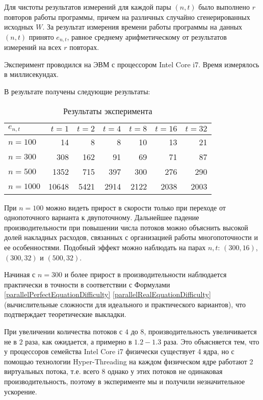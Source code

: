 \documentclass{article}
\begin{document}
	Для чистоты результатов измерений для каждой пары $(n,t)$ было выполнено $r$ повторов работы программы, причем на различных случайно сгенерированных исходных $W$. За результат измерения времени работы программы на данных $(n,t)$ принято $e_{n,t}$, равное среднему арифметическому от результатов измерений на всех $r$ повторах.
	
	Эксперимент проводился на ЭВМ с процессором Intel Core i7. Время измерялось в миллисекундах.
	
	В результате получены следующие результаты:
	
	\begin{table}
	\caption{Результаты эксперимента}
	\begin{center}
	\begin{tabular}{ | l | rrrrrr | }
		\hline
		$e_{n,t}$ & $t=1$   & $t=2$  & $t=4$  & $t=8$  & $t=16$ & $t=32$ \\ 
		\hline        
		$n=100$   & 14      & 8      & 8      & 10     & 13     & 21     \\
		$n=300$   & 308     & 162    & 91     & 69     & 71     & 87     \\
		$n=500$   & 1352    & 715    & 397    & 300    & 276    & 290    \\
		$n=1000$  & 10648   & 5421   & 2914   & 2122   & 2038   & 2003   \\
		\hline
		\end{tabular}
	\end{center}
	\end{table}
	
	При $n=100$ можно видеть прирост в скорости только при переходе от однопоточного варианта к двупоточному. Дальнейшее падение производительности при повышении числа потоков можно объяснить высокой долей накладных расходов, связанных с организацией работы многопоточности и ее особенностями. Подобный эффект можно наблюдать на парах $n,t$: $(300,16)$, $(300,32)$ и $(500,32)$.
	
	Начиная с $n=300$ и более прирост в производительности наблюдается практически в точности в соответствии с Формулами \ref{parallelPerfectEquationDifficulty} \ref{parallelRealEquationDifficulty} (вычислительные сложности для идеального и практического вариантов), что подтверждает теоретические выкладки.
	
	При увеличении количества потоков с $4$ до $8$, производительность увеличивается не в $2$ раза, как ожидается, а примерно в $1.2-1.3$ раза. Это объясняется тем, что у процессоров семейства Intel Core i7 физически существует 4 ядра, но с помощью технологии Hyper-Threading на каждом физическом ядре работают 2 виртуальных потока, т.е. всего $8$ однако у этих потоков не одинаковая производительность, поэтому в эксперименте мы и получили незначительное ускорение.
	
\end{document}
